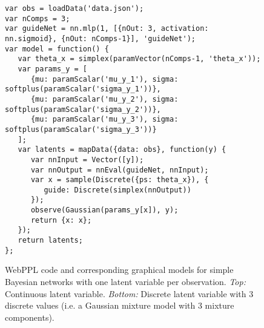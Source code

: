 \begin{figure}
\begin{minipage}{\linewidth}
\begin{minipage}{0.66\linewidth}
\begin{lstlisting}[style=smaller]
var obs = loadData('data.json');
var nComps = 3;
var guideNet = nn.mlp(1, [{nOut: 3, activation: nn.sigmoid}, {nOut: nComps-1}], 'guideNet');
var model = function() {
   var theta_x = simplex(paramVector(nComps-1, 'theta_x'));
   var params_y = [
      {mu: paramScalar('mu_y_1'), sigma: softplus(paramScalar('sigma_y_1'))},
      {mu: paramScalar('mu_y_2'), sigma: softplus(paramScalar('sigma_y_2'))},
      {mu: paramScalar('mu_y_3'), sigma: softplus(paramScalar('sigma_y_3'))}
   ];
   var latents = mapData({data: obs}, function(y) {
      var nnInput = Vector([y]);
      var nnOutput = nnEval(guideNet, nnInput);
      var x = sample(Discrete({ps: theta_x}), {
         guide: Discrete(simplex(nnOutput))
      });
      observe(Gaussian(params_y[x]), y);
      return {x: x};
   });
   return latents;
};
\end{lstlisting}
\end{minipage}
%
\begin{minipage}{0.33\linewidth}
\begin{flushright}
\end{flushright}
\end{minipage}
\end{minipage}

\caption{WebPPL code and corresponding graphical models for simple Bayesian networks with one latent variable per observation. \emph{Top:} Continuous latent variable. \emph{Bottom:} Discrete latent variable with 3 discrete values (i.e. a Gaussian mixture model with 3 mixture components).}
\label{fig:bn_oneLatent}

\end{figure}


